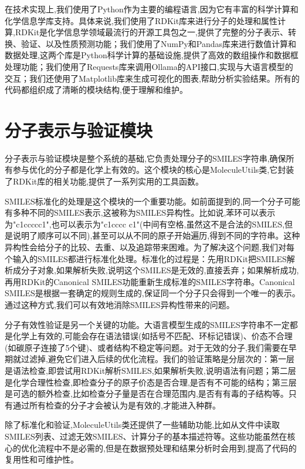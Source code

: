 在技术实现上,我们使用了Python作为主要的编程语言,因为它有丰富的科学计算和化学信息学库支持。具体来说,我们使用了RDKit库来进行分子的处理和属性计算,RDKit是化学信息学领域最流行的开源工具包之一,提供了完整的分子表示、转换、验证、以及性质预测功能；我们使用了NumPy和Pandas库来进行数值计算和数据处理,这两个库是Python科学计算的基础设施,提供了高效的数组操作和数据框处理功能；我们使用了Requests库来调用Ollama的API接口,实现与大语言模型的交互；我们还使用了Matplotlib库来生成可视化的图表,帮助分析实验结果。所有的代码都组织成了清晰的模块结构,便于理解和维护。

\section{分子表示与验证模块}

分子表示与验证模块是整个系统的基础,它负责处理分子的SMILES字符串,确保所有参与优化的分子都是化学上有效的。这个模块的核心是MoleculeUtils类,它封装了RDKit库的相关功能,提供了一系列实用的工具函数。

SMILES标准化的处理是这个模块的一个重要功能。如前面提到的,同一个分子可能有多种不同的SMILES表示,这被称为SMILES异构性。比如说,苯环可以表示为"c1ccccc1",也可以表示为"c1cccc c1"(中间有空格,虽然这不是合法的SMILES,但是说明了顺序可以不同),甚至可以从不同的原子开始遍历,得到不同的字符串。这种异构性会给分子的比较、去重、以及追踪带来困难。为了解决这个问题,我们对每个输入的SMILES都进行标准化处理。标准化的过程是：先用RDKit把SMILES解析成分子对象,如果解析失败,说明这个SMILES是无效的,直接丢弃；如果解析成功,再用RDKit的Canonical SMILES功能重新生成标准的SMILES字符串。Canonical SMILES是根据一套确定的规则生成的,保证同一个分子只会得到一个唯一的表示。通过这种方式,我们可以有效地消除SMILES异构性带来的问题。

分子有效性验证是另一个关键的功能。大语言模型生成的SMILES字符串不一定都是化学上有效的,可能会存在语法错误(如括号不匹配、环标记错误)、价态不合理(如碳原子连接了5个键)、或者结构不稳定等问题。对于无效的分子,我们需要在早期就过滤掉,避免它们进入后续的优化流程。我们的验证策略是分层次的：第一层是语法检查,即尝试用RDKit解析SMILES,如果解析失败,说明语法有问题；第二层是化学合理性检查,即检查分子的原子价态是否合理,是否有不可能的结构；第三层是可选的额外检查,比如检查分子量是否在合理范围内,是否有有毒的子结构等。只有通过所有检查的分子才会被认为是有效的,才能进入种群。

除了标准化和验证,MoleculeUtils类还提供了一些辅助功能,比如从文件中读取SMILES列表、过滤无效SMILES、计算分子的基本描述符等。这些功能虽然在核心的优化流程中不是必需的,但是在数据预处理和结果分析时会用到,提高了代码的复用性和可维护性。


